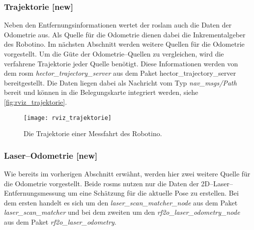 \begin{comment}
--------------------------------------------------------------------------------
- \url{http://wiki.ros.org/hector_trajectory_server}
- \url{http://docs.ros.org/api/nav_msgs/html/msg/Path.html}
\end{comment}
\subsubsection{Trajektorie [new]}

Neben den Entfernungsinformationen wertet der \Gls{roslam} auch die Daten der Odometrie aus. Als Quelle für die Odometrie dienen dabei die Inkrementalgeber des Robotino. Im nächsten Abschnitt werden weitere Quellen für die Odometrie vorgestellt. Um die Güte der Odometrie--Quellen zu vergleichen, wird die verfahrene Trajektorie jeder Quelle benötigt. Diese Informationen werden von dem \Gls{rosm} \textit{hector\_trajectory\_server} aus dem Paket {hector\_trajectory\_server} bereitgestellt. Die Daten liegen dabei als Nachricht vom Typ \textit{nav\_msgs/Path} bereit und können in die Belegungskarte integriert werden, siehe \autoref{fig:rviz_trajektorie}.

\begin{figure}[h]
	\centering
	\texttt{[image: rviz\_trajektorie]}
	\caption{Die Trajektorie einer Messfahrt des Robotino.}
	\label{fig:rviz_trajektorie}
\end{figure}


\begin{comment}
--------------------------------------------------------------------------------
- \url{http://wiki.ros.org/rf2o}
- \url{http://wiki.ros.org/laser_scan_matcher}
\end{comment}
\subsubsection{Laser--Odometrie [new]}

Wie bereits im vorherigen Abschnitt erwähnt, werden hier zwei weitere Quelle für die Odometrie vorgestellt. Beide \Glspl{rosm} nutzen nur die Daten der 2D--Laser--Ent\-fern\-ungs\-mes\-sung um eine Schätzung für die aktuelle Pose zu erstellen. Bei dem ersten handelt es sich um den \textit{laser\_scan\_matcher\_node} aus dem Paket \textit{laser\_scan\_matcher} und bei dem zweiten um den \textit{rf2o\_laser\_odometry\_node} aus dem Paket \textit{rf2o\_laser\_odometry}.



